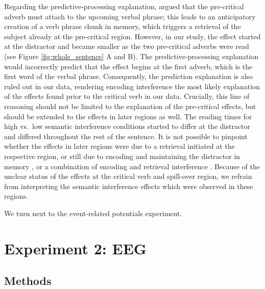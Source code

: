 \documentclass[review,preprint,12pt,authoryear,floatsintext]{elsarticle}
\begin{document}
Regarding the predictive-processing explanation, \citet{mertzen} argued that the pre-critical adverb must attach to the upcoming verbal phrase; this leads to an anticipatory creation of a verb phrase chunk in memory, which triggers a retrieval of the subject already at the pre-critical region. However, in our study, the effect started at the distractor and became smaller as the two pre-critical adverbs were read (see Figure \ref{fig:whole_sentence} A and B). The predictive-processing explanation would incorrectly predict that the effect begins at the first adverb, which is the first word of the verbal phrase. Consequently, the prediction explanation is also ruled out in our data, rendering encoding interference the most likely explanation of the effects found prior to the critical verb in our data. Crucially, this line of reasoning should not be limited to the explanation of the pre-critical effects, but should be extended to the effects in later regions as well. The reading times for high vs.\ low semantic interference conditions started to differ at the distractor and differed throughout the rest of the sentence. It is not possible to pinpoint whether the effects in later regions were due to a retrieval initiated at the respective region, or still due to encoding and maintaining the distractor in memory \citep{ness2017}, or a combination of encoding and retrieval interference \citep{Yadavetal2022}. Because of the unclear status of the effects at the critical verb and spill-over region, we refrain from interpreting the semantic interference effects which were observed in these regions.

We turn next to the event-related potentials experiment.

\clearpage
\section{Experiment 2: EEG}
\subsection{Methods}
\end{document}
